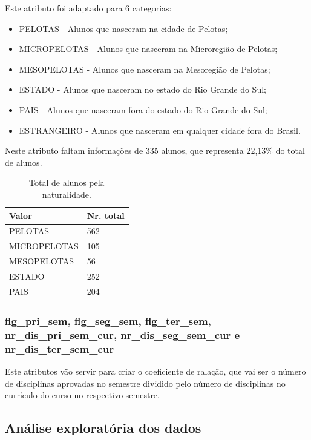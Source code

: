\documentclass[diss,capa]{texufpel}
\begin{document}
Este atributo foi adaptado para 6 categorias:

\begin{itemize}
\item PELOTAS - Alunos que nasceram na cidade de Pelotas;
\item MICROPELOTAS - Alunos que nasceram na Microregião de Pelotas;
\item MESOPELOTAS - Alunos que nasceram na Mesoregião de Pelotas;
\item ESTADO - Alunos que nasceram no estado do Rio Grande do Sul;
\item PAIS - Alunos que nasceram fora do estado do Rio Grande do Sul;
\item ESTRANGEIRO - Alunos que nasceram em qualquer cidade fora do Brasil.
\end{itemize}

Neste atributo faltam informações de 335 alunos, que representa 22,13\% do total de alunos.

\begin{table}[htbp]
\begin{center}
\caption{Total de alunos pela naturalidade.}
\label{tab:total-alunos-naturalidade}
\begin{tabular}{p{8.5cm}|p{6cm}} \hline
Valor & Nr. total \\ \hline
PELOTAS         & 562 \\
MICROPELOTAS    & 105 \\
MESOPELOTAS     & 56  \\
ESTADO          & 252 \\
PAIS            & 204 \\ \hline
\end{tabular}
\end{center}
\end{table}

\subsubsection{flg\_pri\_sem, flg\_seg\_sem, flg\_ter\_sem, nr\_dis\_pri\_sem\_cur, nr\_dis\_seg\_sem\_cur e nr\_dis\_ter\_sem\_cur}

Este atributos vão servir para criar o coeficiente de ralação, que vai ser o número de disciplinas aprovadas no semestre dividido pelo número de disciplinas no currículo do curso no respectivo semestre.

\subsection{Análise exploratória dos dados}
\end{document}
